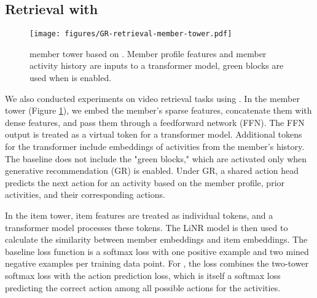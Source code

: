\subsection{Retrieval with {\systemname}}\label{sec:retrieval_gr}
\begin{figure}
    \centering
    \texttt{[image: figures/GR-retrieval-member-tower.pdf]}
    \caption{{\systemname} member tower based on {\systemname}. Member profile features and member activity history are inputs to a transformer model, green blocks are used when {\systemname} is enabled.}
    \label{fig:gr-retrieval-member-tower}
\end{figure}

We also conducted experiments on video retrieval tasks using {\systemname}. In the member tower (Figure \ref{fig:gr-retrieval-member-tower}), we embed the member's sparse features, concatenate them with dense features, and pass them through a feedforward network (FFN). The FFN output is treated as a virtual token for a transformer model. Additional tokens for the transformer include embeddings of activities from the member's history. The baseline does not include the "green blocks," which are activated only when generative recommendation (GR) is enabled. Under GR, a shared action head predicts the next action for an activity based on the member profile, prior activities, and their corresponding actions.

In the item tower, item features are treated as individual tokens, and a transformer model processes these tokens. The LiNR model \cite{Linr_paper} is then used to calculate the similarity between member embeddings and item embeddings. The baseline loss function is a softmax loss with one positive example and two mined negative examples per training data point. For {\systemname}, the loss combines the two-tower softmax loss with the action prediction loss, which is itself a softmax loss predicting the correct action among all possible actions for the activities.

